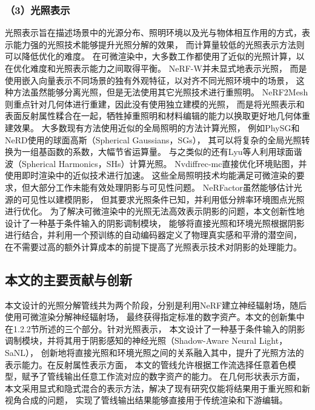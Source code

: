 \subsubsection*{（3）光照表示}

光照表示旨在描述场景中的光源分布、照明环境以及光与物体相互作用的方式，表示能力强的光照技术能够提升光照分解的效果，
而计算量较低的光照表示方法则可以降低优化的难度。
在可微渲染中，大多数工作都使用了近似的光照计算，以在优化难度和光照表示能力之间取得平衡。
NeRF-W\cite{martinbrualla2020nerfw}并未显式地表示光照，
而是使用嵌入向量表示不同场景的独有外观特征，以对齐不同光照环境中的场景，
这种方法虽然能够分离光照，但是无法使用其它光照技术进行重照明。
NeRF2Mesh\cite{Tang_2023}则重点针对几何体进行重建，因此没有使用独立建模的光照，
而是将光照表示和表面反射属性糅合在一起，牺牲掉重照明和材料编辑的能力以换取更好地几何体重建效果。
大多数现有方法使用近似的全局照明的方法计算光照，
例如PhySG\cite{Zhang_2021}和NeRD\cite{Boss_2021}使用的球面高斯（Spherical Gaussians，SGs），
其可以将复杂的全局光照转换为一组基函数的系数，大幅节省运算量。
与之类似的还有Lyu等人\cite{kuang2022neroic}利用球面谐波（Spherical Harmonics，SHs）计算光照。
Nvdiffrec-mc\cite{10.5555/3600270.3601931}直接优化环境贴图，并使用即时渲染中的近似技术进行加速。
这些全局照明技术均能满足可微渲染的要求，但大部分工作未能有效处理阴影与可见性问题。
NeRFactor虽然能够估计光源的可见性以建模阴影，
但其要求光照条件已知，并利用低分辨率环境图点光照\cite{zhang2021nerfactor}进行优化。
为了解决可微渲染中的光照无法高效表示阴影的问题，本文创新性地设计了一种基于条件输入的阴影调制模块，
能够将直接光照和环境光照根据阴影进行结合，并利用一个预训练的自动编码器定义了物理真实感和平滑的潜空间，
在不需要过高的额外计算成本的前提下提高了光照表示技术对阴影的处理能力。

\subsection{本文的主要贡献与创新}

本文设计的光照分解管线共为两个阶段，分别是利用NeRF建立神经辐射场，随后使用可微渲染分解神经辐射场，
最终获得指定标准的数字资产。本文的创新集中在1.2.2节所述的三个部分。针对光照表示，
本文设计了一种基于条件输入的阴影调制模块，并将其用于阴影感知的神经光照（Shadow-Aware Neural Light，SaNL），
创新地将直接光照和环境光照之间的关系融入其中，提升了光照方法的表示能力。在反射属性表示方面，
本文的管线允许根据工作流选择任意着色模型，赋予了管线输出任意工作流对应的数字资产的能力。
在几何形状表示方面，本文采用显式和隐式混合的表示方法，解决了现有研究仅能将结果用于重光照和新视角合成的问题，
实现了管线输出结果能够直接用于传统渲染和下游编辑。

